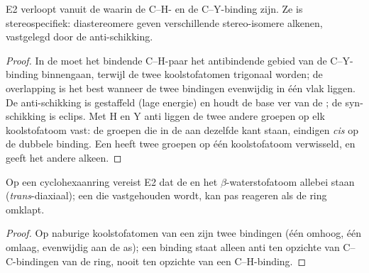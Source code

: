 \begin{proposition}\label{prop:b1:elimination:anti}
E2 verloopt vanuit de  waarin de C--H- en de C--Y-binding
 zijn. Ze is stereospecifiek: diastereomere 
geven verschillende stereo-isomere alkenen, vastgelegd door de
anti-schikking.
\end{proposition}

\begin{proof}
In de  moet het bindende C--H-paar het antibindende
gebied van de C--Y-binding binnengaan, terwijl de twee koolstofatomen
trigonaal worden; de overlapping is het best wanneer de twee bindingen
evenwijdig in één vlak liggen. De anti-schikking is gestaffeld (lage
energie) en houdt de base ver van de ; de syn-schikking
is eclips. Met H en Y anti liggen de twee andere groepen op elk
koolstofatoom vast: de groepen die in de  aan dezelfde
kant staan, eindigen \textit{cis} op de dubbele binding. Een 
heeft twee groepen op één koolstofatoom verwisseld, en geeft het andere
alkeen.
\end{proof}

\begin{proposition}\label{prop:b1:elimination:cyclohexane-e2}
Op een cyclohexaanring vereist E2 dat de  en het
$\beta$-waterstofatoom allebei  staan (\textit{trans}-diaxiaal); een
 die  vastgehouden wordt, kan pas reageren
als de ring omklapt.
\end{proposition}

\begin{proof}
Op naburige koolstofatomen van een  zijn twee  bindingen
 (één omhoog, één omlaag, evenwijdig aan de as); een
 binding staat alleen anti ten opzichte van C--C-bindingen van
de ring, nooit ten opzichte van een C--H-binding.
\end{proof}

